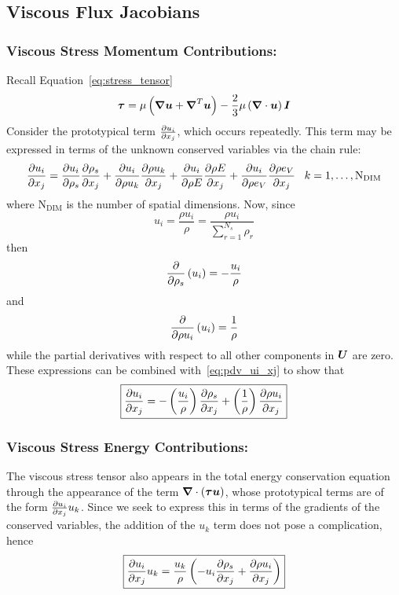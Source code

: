 \subsection{Viscous Flux Jacobians\label{app:viscous_flux_jacobians}}

\subsubsection*{Viscous Stress Momentum Contributions:} Recall Equation~\eqref{eq:stress_tensor}
\begin{equation*}
  {\boldsymbol{\tau}} = \mu\left({\boldsymbol{\nabla}} {{\boldsymbol{u}}} + {\boldsymbol{\nabla}}^T {{\boldsymbol{u}}}\right) -\frac{2}{3}\mu \left({\boldsymbol{\nabla}} {}\cdot{\boldsymbol{u}}\right){\boldsymbol{I}}
\end{equation*}
Consider the prototypical term ${\frac{\partial{u_i}}{\partial{x_j}}}$, which occurs repeatedly.  This term may be expressed in terms of the unknown conserved variables via the chain rule:
\begin{equation}
  \label{eq:pdv_ui_xj}
  {\frac{\partial{u_i}}{\partial{x_j}}} = {\frac{\partial{u_i}}{\partial{\rho_s}}}{\frac{\partial{\rho_s}}{\partial{x_j}}} + {\frac{\partial{u_i}}{\partial{\rho u_k}}}{\frac{\partial{\rho u_k}}{\partial{x_j}}} + {\frac{\partial{u_i}}{\partial{\rho E}}}{\frac{\partial{\rho E}}{\partial{x_j}}} + {\frac{\partial{u_i}}{\partial{\rho e_V}}}{\frac{\partial{\rho e_V}}{\partial{x_j}}}    \;\;\; k=1,\ldots,\text{N}_{\text{DIM}}
\end{equation}
where $\text{N}_{\text{DIM}}$ is the number of spatial dimensions. Now, since
\begin{equation*}
  u_i = \frac{\rho u_i}{\rho} = \frac{\rho u_i}{\sum_{r=1}^{N_s} \rho_r}
\end{equation*}
then
\begin{equation}
  {\frac{\partial{}}{\partial{\rho_s}}}\left(u_i\right) = -\frac{u_i}{\rho}
\end{equation}
and
\begin{equation}
  {\frac{\partial{}}{\partial{\rho u_i}}}\left(u_i\right) = \frac{1}{\rho}
\end{equation}
while the partial derivatives with respect to all other components in ${\boldsymbol{U}}$ are zero.  These expressions can be combined with~\eqref{eq:pdv_ui_xj} to show that
\begin{equation}
  \boxed{{\frac{\partial{u_i}}{\partial{x_j}}} = -\left(\frac{u_i}{\rho}\right){\frac{\partial{\rho_s}}{\partial{x_j}}} + \left(\frac{1}{\rho}\right){\frac{\partial{\rho u_i}}{\partial{x_j}}}}
\end{equation}

\subsubsection*{Viscous Stress Energy Contributions:} The viscous stress tensor also appears in the total energy conservation equation through the appearance of the term ${\boldsymbol{\nabla}} {}\cdot\left({\boldsymbol{\tau}}{\boldsymbol{u}}\right)$, whose prototypical terms are of the form ${\frac{\partial{u_i}}{\partial{x_j}}}u_k$.  Since we seek to express this in terms of the gradients of the conserved variables, the addition of the $u_k$ term does not pose a complication, hence
\begin{equation}
  \boxed{{\frac{\partial{u_i}}{\partial{x_j}}}u_k = \frac{u_k}{\rho}\left(-u_i{\frac{\partial{\rho_s}}{\partial{x_j}}} + {\frac{\partial{\rho u_i}}{\partial{x_j}}}\right)}
\end{equation}


